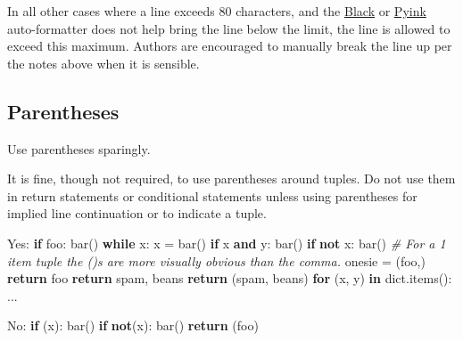 \documentclass[
]{article}
\newenvironment{Shaded}{}{}
\newcommand{\BuiltInTok}[1]{\textcolor[rgb]{0.00,0.50,0.00}{#1}}
\newcommand{\CommentTok}[1]{\textcolor[rgb]{0.38,0.63,0.69}{\textit{#1}}}
\newcommand{\ControlFlowTok}[1]{\textcolor[rgb]{0.00,0.44,0.13}{\textbf{#1}}}
\newcommand{\KeywordTok}[1]{\textcolor[rgb]{0.00,0.44,0.13}{\textbf{#1}}}
\newcommand{\NormalTok}[1]{#1}
\newcommand{\OperatorTok}[1]{\textcolor[rgb]{0.40,0.40,0.40}{#1}}
\begin{document}
In all other cases where a line exceeds 80 characters, and the
\href{https://github.com/psf/black}{Black} or
\href{https://github.com/google/pyink}{Pyink} auto-formatter does not
help bring the line below the limit, the line is allowed to exceed this
maximum. Authors are encouraged to manually break the line up per the
notes above when it is sensible.

\subsection{Parentheses}

Use parentheses sparingly.

It is fine, though not required, to use parentheses around tuples. Do
not use them in return statements or conditional statements unless using
parentheses for implied line continuation or to indicate a tuple.

\begin{samepage}
\begin{Shaded}
\begin{Highlighting}[]
\NormalTok{Yes: }\ControlFlowTok{if}\NormalTok{ foo:}
\NormalTok{         bar()}
     \ControlFlowTok{while}\NormalTok{ x:}
\NormalTok{         x }\OperatorTok{=}\NormalTok{ bar()}
     \ControlFlowTok{if}\NormalTok{ x }\KeywordTok{and}\NormalTok{ y:}
\NormalTok{         bar()}
     \ControlFlowTok{if} \KeywordTok{not}\NormalTok{ x:}
\NormalTok{         bar()}
     \CommentTok{\# For a 1 item tuple the ()s are more visually obvious than the comma.}
\NormalTok{     onesie }\OperatorTok{=}\NormalTok{ (foo,)}
     \ControlFlowTok{return}\NormalTok{ foo}
     \ControlFlowTok{return}\NormalTok{ spam, beans}
     \ControlFlowTok{return}\NormalTok{ (spam, beans)}
     \ControlFlowTok{for}\NormalTok{ (x, y) }\KeywordTok{in} \BuiltInTok{dict}\NormalTok{.items(): ...}
\end{Highlighting}
\end{Shaded}
\end{samepage}

\begin{samepage}
\begin{Shaded}
\begin{Highlighting}[]
\NormalTok{No:  }\ControlFlowTok{if}\NormalTok{ (x):}
\NormalTok{         bar()}
     \ControlFlowTok{if} \KeywordTok{not}\NormalTok{(x):}
\NormalTok{         bar()}
     \ControlFlowTok{return}\NormalTok{ (foo)}
\end{Highlighting}
\end{Shaded}
\end{samepage}
\end{document}

